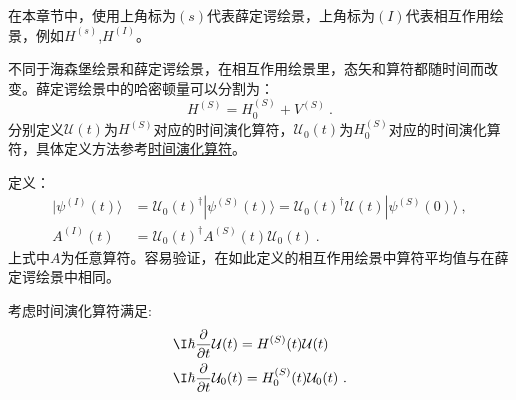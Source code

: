 
在本章节中，使用上角标为$(s)$代表薛定谔绘景，上角标为$(I)$代表相互作用绘景，例如$H^{(s)}$,$H^{(I)}$。

\begin{definition}{}

不同于海森堡绘景和薛定谔绘景，在相互作用绘景里，态矢和算符都随时间而改变。薛定谔绘景中的哈密顿量可以分割为：
\begin{equation}
H^{(S)}=H^{(S)}_0+V^{(S)}~.
\end{equation}
分别定义$\mathcal U(t)$为$H^{(S)}$对应的时间演化算符，$\mathcal U_0(t)$为$H^{(S)}_0$对应的时间演化算符，具体定义方法参考\href{https://wuli.wiki/online/TOprt.html}{时间演化算符}。

定义：
\begin{align}
|\psi^{(I)}(t)\rangle&=\mathcal U_0(t)^\dagger|\psi^{(S)}(t)\rangle=\mathcal U_0(t)^\dagger\mathcal U(t)|\psi^{(S)}(0)\rangle~, \\
A^{(I)}(t)&=\mathcal U_0(t)^\dagger A^{(S)}(t)\mathcal U_0 (t)~.
\end{align}
上式中$A$为任意算符。容易验证，在如此定义的相互作用绘景中算符平均值与在薛定谔绘景中相同。

\end{definition}

考虑时间演化算符满足:
\begin{align}
&\I\hbar\frac{\partial}{\partial t}\mathcal{U}(t) = H^{(S)}(t)\mathcal{U}(t) \\
&\I\hbar\frac{\partial}{\partial t}\mathcal{U}_0(t) = H^{(S)}_0(t)\mathcal{U}_0(t)~.
\end{align}

